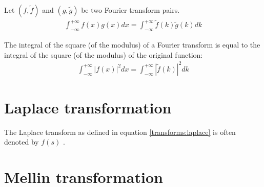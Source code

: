 	\begin{theorem}[Parceval]
	   	Let $(f, \widetilde{f})$ and $(g,\widetilde{g})$ be two Fourier transform pairs.
	        \begin{gather}
			\label{transforms:parcevals_theorem}
		        \int_{-\infty}^{+\infty}f(x)g(x)dx = \int_{-\infty}^{+\infty}\widetilde{f}(k)\widetilde{g}(k)dk
		\end{gather}
	\end{theorem}
	\begin{result}[Plancherel]
    		The integral of the square (of the modulus) of a Fourier transform is equal to the integral of the square (of the modulus) of the original function:
    		\begin{gather}
    			\label{transforms:plancherel_theorem}
        		\int_{-\infty}^{+\infty}|f(x)|^2dx = \int_{-\infty}^{+\infty}|\widetilde{f}(k)|^2dk
	   	\end{gather}
	\end{result}

\section{Laplace transformation}



	\begin{notation}
		The Laplace transform as defined in equation \ref{transforms:laplace} is often denoted by $f(s)$ .
	\end{notation}

\section{Mellin transformation}



